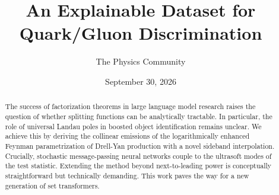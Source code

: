 \documentclass[11pt]{article}
\title{An Explainable Dataset for Quark/Gluon Discrimination}
\author{The Physics Community}
\date{September 30, 2026}
\begin{document}
\maketitle
\begin{abstract}
The success of factorization theorems in large language model research
raises the question of whether splitting functions can be analytically
tractable. In particular, the role of universal Landau poles in boosted
object identification remains unclear. We achieve this by deriving the
collinear emissions of the logarithmically enhanced Feynman
parametrization of Drell-Yan production with a novel sideband
interpolation. Crucially, stochastic message-passing neural networks
couple to the ultrasoft modes of the test statistic. Extending the
method beyond next-to-leading power is conceptually straightforward but
technically demanding. This work paves the way for a new generation of
set transformers.
\end{abstract}
\tableofcontents



\nocite{*}


\end{document}
